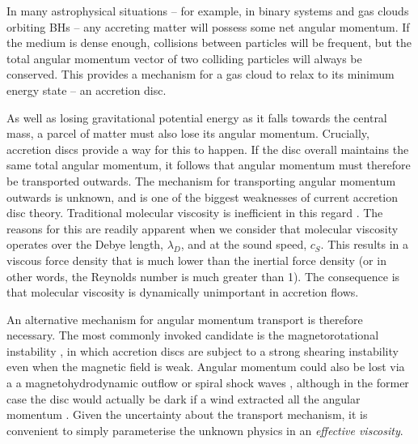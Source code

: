 In many astrophysical situations -- for example, 
in binary systems and gas clouds orbiting BHs --
any accreting matter will possess some net angular momentum.
If the medium is dense enough, collisions between particles will be
frequent, but the total angular momentum vector of two colliding particles
will always be conserved. This provides a mechanism for a gas cloud to relax to 
its minimum energy state -- an accretion disc. 

As well as losing gravitational potential energy as it falls towards 
the central mass, a parcel of matter must also lose its angular momentum. 
Crucially, accretion discs provide a way for this to happen. 
If the disc overall maintains the same total 
angular momentum, it follows that angular momentum must 
therefore be transported outwards. The mechanism for transporting 
angular momentum outwards is unknown, and is one of the biggest 
weaknesses of current accretion disc theory. 
Traditional molecular viscosity is inefficient in this regard 
\citep{pringle1981}. The reasons for this are readily apparent
when we consider that molecular viscosity operates over the Debye length,
$\lambda_D$, and at the sound speed, $c_S$. This results in a 
viscous force density that is much lower 
than the inertial force density (or in other words,
the Reynolds number is much greater than 1). The consequence is that
molecular viscosity is dynamically unimportant in accretion flows.

An alternative mechanism for angular momentum transport is therefore
necessary. The most commonly invoked
candidate is the magnetorotational instability \citep[MRI; ][]{balbus1991},
in which accretion discs are subject to a strong shearing instability even
when the magnetic field is weak. 
Angular momentum could also be lost via a a magnetohydrodynamic 
outflow \citep{blandfordpayne} or spiral shock waves
\citep{ju2016}, although in the former case the disc would actually
be dark if a wind extracted all the angular momentum 
\citep[e.g.][]{spruit1996,knigge1999}. 
Given the uncertainty about the transport mechanism, it is 
convenient to simply parameterise the unknown physics in 
an {\em effective viscosity}.





